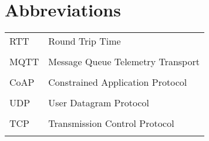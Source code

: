 \section*{Abbreviations}
\label{ch:abbreviations}

{}

\begin{table}[ht!]
    \begin{tabular}{l l}
        RTT & Round Trip Time \\\\
        MQTT & Message Queue Telemetry Transport \\\\
        CoAP & Constrained Application Protocol \\\\
        UDP & User Datagram Protocol  \\\\
        TCP & Transmission Control Protocol  \\\\
    \end{tabular}
\end{table}